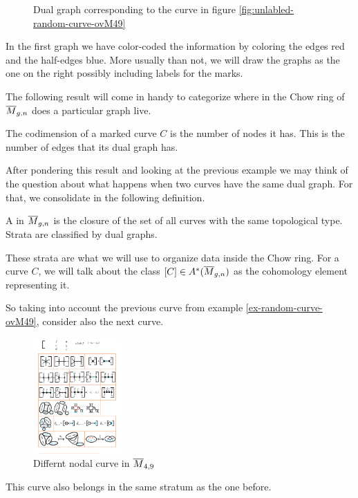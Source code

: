 \documentclass[12pt]{memoir}
\begin{document}
\begin{Ex}
\begin{figure}[h!]
        \caption{Dual graph corresponding to the curve in figure \ref{fig:unlabled-random-curve-ovM49}}
        \label{fig:unlabled-random-curve-ovM49-graphs}
    \end{figure}
    In the first graph we have color-coded the information by coloring the edges red and the half-edges blue. More usually than not, we will draw the graphs as the one on the right possibly including labels for the marks.
\end{Ex}

The following result will come in handy to categorize where in the Chow ring of $\overline M_{g,n}$ does a particular graph live.
\begin{Th}
    The codimension of a marked curve $C$ is the number of nodes it has. This is the number of edges that its dual graph has.
\end{Th}

After pondering this result and looking at the previous example we may think of the question about what happens when two curves have the same dual graph. For that, we consolidate in the following definition.

\begin{Def}
    A  in $\overline{M}_{g,n}$ is the closure of the set of all curves with the same topological type. Strata are classified by dual graphs. 
\end{Def}

These strata are what we will use to organize data inside the Chow ring. For a curve $C$, we will talk about the class $[C]\in A^\ast(\overline M_{g,n})$ as the cohomology element representing it. 

\begin{Ex}
    So taking into account the previous curve from example \ref{ex-random-curve-ovM49}, consider also the next curve. 
    \begin{figure}[h!]
        \centering
        \includegraphics[width=0.3\textwidth, trim= 1.32cm 5.5cm 17cm 19.1cm,clip]{../figs/FigsDNnotability1.pdf}
        \caption{Differnt nodal curve in $\overline M_{4,9}$}
        \label{fig:another-unlabled-random-curve-ovM49}
    \end{figure}
    This curve also belongs in the same stratum as the one before. 
\end{Ex}
\end{document}
